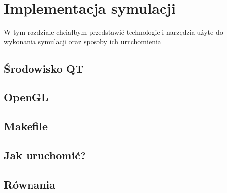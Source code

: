 \chapter{Implementacja symulacji}
\label{cha:implementacja}

W tym rozdziale chciałbym przedstawić technologie i narzędzia użyte do wykonania symulacji oraz sposoby ich uruchomienia.


\section{Środowisko QT}
\label{sec:qt}

\section{OpenGL}
\label{sec:opengl}

\section{Makefile}
\label{sec::makefile}

\section{Jak uruchomić?}
\label{sec::uruchomic}

\section{Równania}
\label{sec::rownania}
